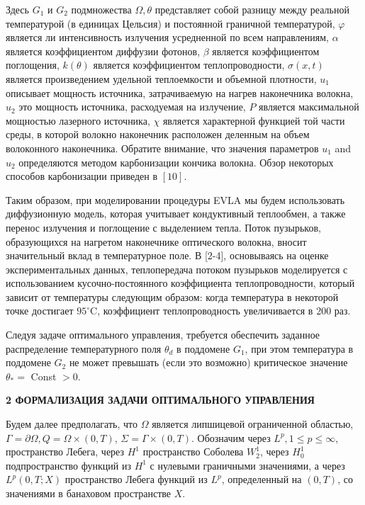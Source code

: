Здесь $G_{1}$ и $G_{2}$ подмножества $\Omega, \theta$
представляет собой разницу между реальной температурой
(в единицах Цельсия) и постоянной граничной температурой,
$\varphi$ является ли интенсивность излучения усредненной по всем направлениям, $\alpha$
является коэффициентом диффузии фотонов, $\beta$ является коэффициентом поглощения,
$k(\theta)$ является коэффициентом теплопроводности, $\sigma(x, t)$
является произведением удельной теплоемкости и объемной плотности, $u_{1}$
описывает мощность источника, затрачиваемую на нагрев наконечника волокна, $u_{2}$
это мощность источника, расходуемая на излучение,
$P$ является максимальной мощностью лазерного источника, $\chi$
является характерной функцией той части среды, в которой волокно
наконечник расположен деленным на объем волоконного наконечника.
Обратите внимание, что значения параметров $u_{1}$ and $u_{2}$
определяются методом карбонизации кончика волокна.
Обзор некоторых способов карбонизации приведен в $[10]$.

Таким образом, при моделировании процедуры EVLA мы будем использовать диффузионную модель,
которая учитывает кондуктивный теплообмен, а также перенос излучения и поглощение с выделением тепла.
Поток пузырьков, образующихся на нагретом наконечнике оптического волокна, вносит значительный
вклад в температурное поле. В [2-4], основываясь на оценке экспериментальных данных,
теплопередача потоком пузырьков моделируется с использованием кусочно-постоянного
коэффициента теплопроводности, который зависит от температуры следующим образом:
когда температура в некоторой точке достигает $95 ^ {\circ} \mathrm{C}$,
коэффициент теплопроводность увеличивается в 200 раз.

Следуя задаче оптимального управления, требуется обеспечить заданное распределение
температурного поля $\theta_{d}$ в поддомене $G_{1}$,
при этом температура в поддомене $G_{2}$ не может превышать
(если это возможно) критическое значение $\theta_{*}=$ Const $>0$.



\textbf{2 ФОРМАЛИЗАЦИЯ ЗАДАЧИ ОПТИМАЛЬНОГО УПРАВЛЕНИЯ}


Будем далее предполагать, что $\Omega$ является липшицевой ограниченной областью,
$\Gamma=\partial \Omega, Q=\Omega \times(0, T)$, $\Sigma=\Gamma \times(0, T)$.
Обозначим через $L^{p}, 1 \leq p \leq \infty$, пространство Лебега,
через $H^{1}$ пространство Соболева $W_{2}^{1}$,
через $H_{ 0}^{1}$ подпространство функций из $H^{1}$ с нулевыми граничными значениями,
а через $L^{p}(0, T ; X)$ пространство Лебега функций из $L^{ p}$,
определенный на $(0, T)$, со значениями в банаховом пространстве $X$.

